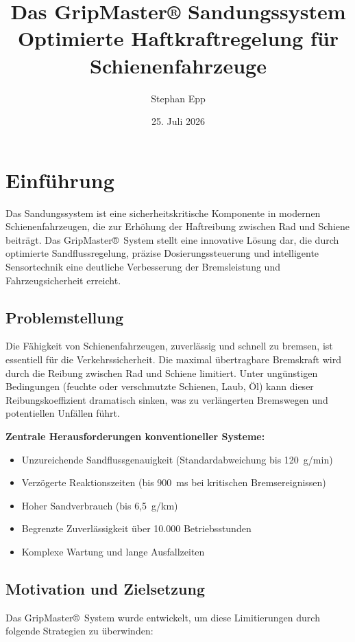 \documentclass[a4paper,12pt]{article}
\title{Das GripMaster® Sandungssystem\\[10pt]
	\large Optimierte Haftkraftregelung für Schienenfahrzeuge}
\author{Stephan Epp}
\date{25. Juli 2026}
\theoremstyle{definition}
\theoremstyle{remark}
\begin{document}
\maketitle

\tableofcontents
\newpage

\section{Einführung}

Das Sandungssystem ist eine sicherheitskritische Komponente in modernen Schienenfahrzeugen, die zur Erhöhung der Haftreibung zwischen Rad und Schiene beiträgt. Das GripMaster®~System stellt eine innovative Lösung dar, die durch optimierte Sandflussregelung, präzise Dosierungssteuerung und intelligente Sensortechnik eine deutliche Verbesserung der Bremsleistung und Fahrzeugsicherheit erreicht.

\subsection{Problemstellung}

Die Fähigkeit von Schienenfahrzeugen, zuverlässig und schnell zu bremsen, ist essentiell für die Verkehrssicherheit. Die maximal übertragbare Bremskraft wird durch die Reibung zwischen Rad und Schiene limitiert. Unter ungünstigen Bedingungen (feuchte oder verschmutzte Schienen, Laub, Öl) kann dieser Reibungskoeffizient dramatisch sinken, was zu verlängerten Bremswegen und potentiellen Unfällen führt.

\textbf{Zentrale Herausforderungen konventioneller Systeme:}
\begin{itemize}
	\item Unzureichende Sandflussgenauigkeit (Standardabweichung bis 120~g/min)
	\item Verzögerte Reaktionszeiten (bis 900~ms bei kritischen Bremsereignissen)
	\item Hoher Sandverbrauch (bis 6,5~g/km)
	\item Begrenzte Zuverlässigkeit über 10.000 Betriebsstunden
	\item Komplexe Wartung und lange Ausfallzeiten
\end{itemize}

\subsection{Motivation und Zielsetzung}

Das GripMaster®~System wurde entwickelt, um diese Limitierungen durch folgende Strategien zu überwinden:
\end{document}
